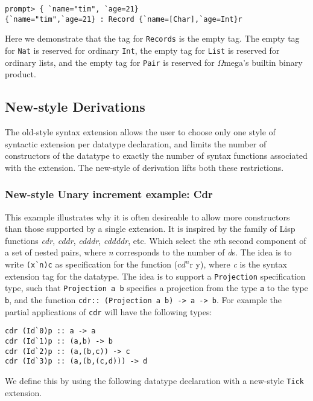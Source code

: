 \documentclass[11pt,twoside]{article}
\newcommand{\om}{$\Omega$mega}
\begin{document}
\begin{verbatim}
prompt> { `name="tim", `age=21}
{`name="tim",`age=21} : Record {`name=[Char],`age=Int}r
\end{verbatim} 

Here we demonstrate that the tag for {\tt Records} is the empty tag.
The empty tag for {\tt Nat} is reserved for ordinary {\tt Int},
the empty tag for {\tt List} is reserved for ordinary lists,
and the empty tag for {\tt Pair} is reserved for \om's builtin binary
product.

\subsection{New-style Derivations}

The old-style syntax extension allows the user to choose only one style of syntactic extension
per datatype declaration, and limits the number of constructors of the datatype to exactly the number
of syntax functions associated with the extension. The new-style of derivation lifts both these restrictions.

\subsubsection{New-style Unary increment example: Cdr}

This example illustrates why it is often desireable to allow more constructors than those supported by a
single extension. It is inspired by the family of Lisp functions {\it cdr}, {\it cddr}, {\it cdddr}, {\it
cddddr}, etc. Which select the {\it n}th second component of a set of nested pairs, where {\it n}
corresponds to the number of {\it d}s. The idea is to write \verb+(x`n)c+ as specification
for the function (c$d^n$r y), where {\it c}
is the syntax extension tag for the datatype. The idea is to support a {\tt Projection}
specification type, such that {\tt Projection a b} specifies a projection from the type {\tt a}
to the type {\tt b}, and the function {\tt cdr:: (Projection a b) -> a -> b}. For
example the partial applications of {\tt cdr} will have the following types:

\begin{verbatim}
cdr (Id`0)p :: a -> a
cdr (Id`1)p :: (a,b) -> b
cdr (Id`2)p :: (a,(b,c)) -> c
cdr (Id`3)p :: (a,(b,(c,d))) -> d
\end{verbatim}

We define this by using the following datatype declaration with a new-style {\tt Tick}
extension.
\end{document}

